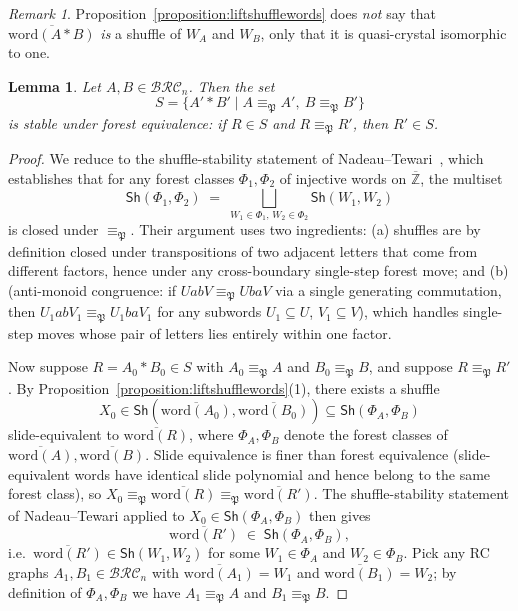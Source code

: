 \documentclass{amsart}
\newtheorem{lemma}{Lemma}[subsection]
\theoremstyle{definition}
\theoremstyle{remark}
\newtheorem*{remark}{Remark}
\numberwithin{equation}{subsection}
\newcommand{\BRC}{\mathcal{BRC}}
\newcommand{\forest}{\mathfrak{P}}
\begin{document}
\begin{remark}
Proposition~\ref{proposition:liftshufflewords} does \emph{not} say that $\overline{\mathrm{word}(A*B)}$ \emph{is} a shuffle of $W_A$ and $W_B$, only that it is quasi-crystal isomorphic to one.
\end{remark}

\begin{lemma}\label{lemma:foreststable}
Let $A,B\in\BRC_n$. Then the set
$$S=\{A'*B'\mid A\equiv_\forest A',\ B\equiv_\forest B'\}$$
is stable under forest equivalence: if $R\in S$ and $R\equiv_\forest R'$, then $R'\in S$.
\end{lemma}
\begin{proof}
We reduce to the shuffle-stability statement of Nadeau--Tewari~\cite[proof of Theorem~6.3]{nadeau2024forest}, which establishes that for any forest classes $\Phi_1,\Phi_2$ of injective words on $\overline{\mathbb{Z}}$, the multiset
\[
\mathsf{Sh}(\Phi_1,\Phi_2)\;=\;\bigsqcup_{W_1\in\Phi_1,\,W_2\in\Phi_2}\mathsf{Sh}(W_1,W_2)
\]
is closed under $\equiv_\forest$. Their argument uses two ingredients: (a) shuffles are by definition closed under transpositions of two adjacent letters that come from different factors, hence under any cross-boundary single-step forest move; and (b) \cite[Lemma~5.10]{nadeau2024forest} (anti-monoid congruence: if $UabV\equiv_\forest UbaV$ via a single generating commutation, then $U_1abV_1\equiv_\forest U_1baV_1$ for any subwords $U_1\subseteq U$, $V_1\subseteq V$), which handles single-step moves whose pair of letters lies entirely within one factor.

Now suppose $R=A_0*B_0\in S$ with $A_0\equiv_\forest A$ and $B_0\equiv_\forest B$, and suppose $R\equiv_\forest R'$. By Proposition~\ref{proposition:liftshufflewords}(1), there exists a shuffle
\[
X_0\in\mathsf{Sh}(\overline{\mathrm{word}(A_0)},\overline{\mathrm{word}(B_0)})\subseteq\mathsf{Sh}(\Phi_A,\Phi_B)
\]
slide-equivalent to $\overline{\mathrm{word}(R)}$, where $\Phi_A,\Phi_B$ denote the forest classes of $\overline{\mathrm{word}(A)},\overline{\mathrm{word}(B)}$. Slide equivalence is finer than forest equivalence (slide-equivalent words have identical slide polynomial and hence belong to the same forest class), so $X_0\equiv_\forest\overline{\mathrm{word}(R)}\equiv_\forest\overline{\mathrm{word}(R')}$. The shuffle-stability statement of Nadeau--Tewari applied to $X_0\in\mathsf{Sh}(\Phi_A,\Phi_B)$ then gives
\[
\overline{\mathrm{word}(R')}\;\in\;\mathsf{Sh}(\Phi_A,\Phi_B),
\]
i.e.\ $\overline{\mathrm{word}(R')}\in\mathsf{Sh}(W_1,W_2)$ for some $W_1\in\Phi_A$ and $W_2\in\Phi_B$. Pick any RC graphs $A_1,B_1\in\BRC_n$ with $\overline{\mathrm{word}(A_1)}=W_1$ and $\overline{\mathrm{word}(B_1)}=W_2$; by definition of $\Phi_A,\Phi_B$ we have $A_1\equiv_\forest A$ and $B_1\equiv_\forest B$.


\end{proof}
\end{document}
